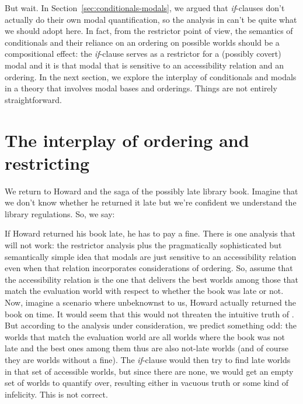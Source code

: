 But wait. In Section~\ref{sec:conditionals-modals}, we argued that
\emph{if}-clauses don't actually do their own modal quantification, so the
analysis in \Last can't be quite what we should adopt here. In fact, from the
restrictor point of view, the semantics of conditionals and their reliance on an
ordering on possible worlds should be a compositional effect: the
\emph{if}-clause serves as a restrictor for a (possibly covert) modal and it is
that modal that is sensitive to an accessibility relation and an ordering. In
the next section, we explore the interplay of conditionals and modals in a
theory that involves modal bases and orderings. Things are not entirely
straightforward. 

\section{The interplay of ordering and restricting}
\label{sec:interplay}

We return to Howard and the saga of the possibly late library book. Imagine that
we don't know whether he returned it late but we're confident we understand the
library regulations. So, we say:

\ex If Howard returned his book late, he has to pay a fine. \xe
%
 There is one analysis
that will not work: the restrictor analysis plus the pragmatically sophisticated
but semantically simple idea that modals are just sensitive to an accessibility
relation even when that relation incorporates considerations of ordering. So,
assume that the accessibility relation is the one that delivers the best worlds
among those that match the evaluation world with respect to whether the book was
late or not. Now, imagine a scenario where unbeknownst to us, Howard actually
returned the book on time. It would seem that this would not threaten the
intuitive truth of \Last. But according to the analysis under consideration, we
predict something odd: the worlds that match the evaluation world are all worlds
where the book was not late and the best ones among them thus are also not-late
worlds (and of course they are worlds without a fine). The \emph{if}-clause
would then try to find late worlds in that set of accessible worlds, but since
there are none, we would get an empty set of worlds to quantify over, resulting
either in vacuous truth or some kind of infelicity. This is not correct.

